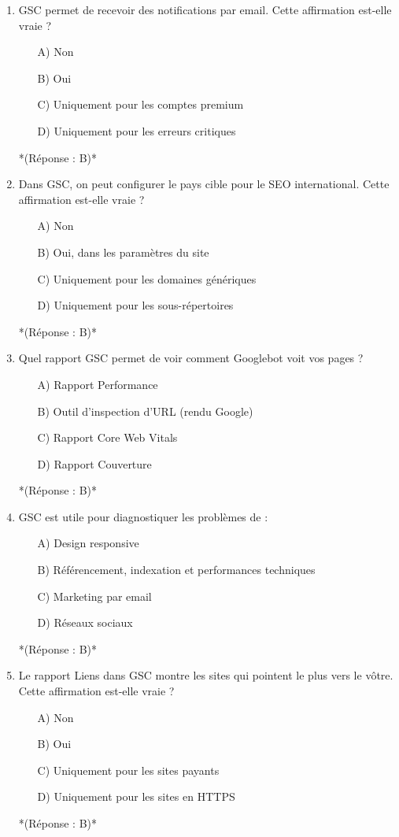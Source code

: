 \documentclass[12pt,a4paper,twoside]{report}
\begin{document}
\begin{enumerate}
    \item GSC permet de recevoir des notifications par email. Cette affirmation est-elle vraie ?
    \begin{itemize}
        \item[A)] Non
        \item[B)] Oui
        \item[C)] Uniquement pour les comptes premium
        \item[D)] Uniquement pour les erreurs critiques
    \end{itemize}
    *(Réponse : B)*

    \item Dans GSC, on peut configurer le pays cible pour le SEO international. Cette affirmation est-elle vraie ?
    \begin{itemize}
        \item[A)] Non
        \item[B)] Oui, dans les paramètres du site
        \item[C)] Uniquement pour les domaines génériques
        \item[D)] Uniquement pour les sous-répertoires
    \end{itemize}
    *(Réponse : B)*

    \item Quel rapport GSC permet de voir comment Googlebot voit vos pages ?
    \begin{itemize}
        \item[A)] Rapport Performance
        \item[B)] Outil d'inspection d'URL (rendu Google)
        \item[C)] Rapport Core Web Vitals
        \item[D)] Rapport Couverture
    \end{itemize}
    *(Réponse : B)*

    \item GSC est utile pour diagnostiquer les problèmes de :
    \begin{itemize}
        \item[A)] Design responsive
        \item[B)] Référencement, indexation et performances techniques
        \item[C)] Marketing par email
        \item[D)] Réseaux sociaux
    \end{itemize}
    *(Réponse : B)*

    \item Le rapport Liens dans GSC montre les sites qui pointent le plus vers le vôtre. Cette affirmation est-elle vraie ?
    \begin{itemize}
        \item[A)] Non
        \item[B)] Oui
        \item[C)] Uniquement pour les sites payants
        \item[D)] Uniquement pour les sites en HTTPS
    \end{itemize}
    *(Réponse : B)*
\end{enumerate}
\end{document}
